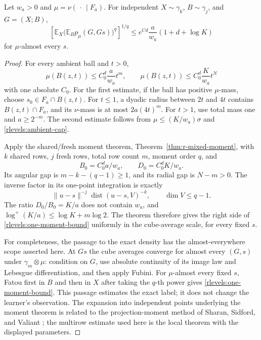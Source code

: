 \begin{lemma}\label{rlevels:one-moment}
Let \(w_a>0\) and \(\mu=\nu(\,\cdot\,\mid F_a)\).  For independent
\(X\sim\gamma_k\), \(B\sim\gamma_j\), and \(G=(X;B)\),
\begin{equation}\label{rlevels:one-moment-bound}
 \left[\mathbb E_X
   \bigl(\mathbb E_B p_\mu(G,Gs)\bigr)^q\right]^{1/q}
 \le e^{Cd}\frac{a}{w_a}(1+d+\log K)
\end{equation}
for \(\mu\)-almost every \(s\).
\end{lemma}

\begin{proof}
For every ambient ball and \(t>0\),
\begin{equation}\label{rlevels:one-two-powers}
 \mu(B(z,t))\le C_0^d\frac{a}{w_a}t^m,
 \qquad
 \mu(B(z,t))\le C_0^d\frac{K}{w_a}t^N
\end{equation}
with one absolute \(C_0\).  For the first estimate, if the ball has
positive \(\mu\)-mass, choose \(s_0\in F_a\cap B(z,t)\).  For
\(t\le1\), a dyadic radius between \(2t\) and \(4t\) contains
\(B(z,t)\cap F_a\), and its \(\nu\)-mass is at most
\(2a(4t)^m\).  For \(t>1\), use total mass one and
\(a\ge2^{-m}\).  The second estimate follows from
\(\mu\le(K/w_a)\sigma\) and \eqref{rlevels:ambient-cap}.

Apply the shared/fresh moment theorem, Theorem~\ref{thm:r-mixed-moment},
with \(k\) shared rows, \(j\) fresh rows, total row count \(m\),
moment order \(q\), and
\[
 B_0=C_0^d a/w_a,\qquad D_0=C_0^d K/w_a.
\]
Its angular gap is \(m-k-(q-1)\ge1\), and its radial gap is
\(N-m>0\).  The inverse factor in its one-point integration is
exactly
\[
 \|u-s\|^{-j}\operatorname{dist}(u-s,V)^{-k},
 \qquad \dim V\le q-1.
\]
The ratio \(D_0/B_0=K/a\) does not contain \(w_a\), and
\(\log^+(K/a)\le\log K+m\log2\).  The theorem therefore gives the
right side of \eqref{rlevels:one-moment-bound} uniformly in the
cube-average scale, for every fixed \(s\).

For completeness, the passage to the exact density has the
almost-everywhere scope asserted here.  At \(Gs\) the cube averages
converge for almost every \((G,s)\) under
\(\gamma_m\otimes\mu\): condition on \(G\), use absolute
continuity of its image law and Lebesgue differentiation, and then
apply Fubini.  For \(\mu\)-almost every fixed \(s\), Fatou first
in \(B\) and then in \(X\) after taking the \(q\)-th power gives
\eqref{rlevels:one-moment-bound}.  This passage estimates the exact
label; it does not change the learner's observation.  The expansion
into independent points underlying the moment theorem is related to
the projection-moment method of Sharan, Sidford, and Valiant
\cite[Section~7, Lemma~12]{SSV2019}; the multirow estimate used here
is the local theorem with the displayed parameters.
\end{proof}

